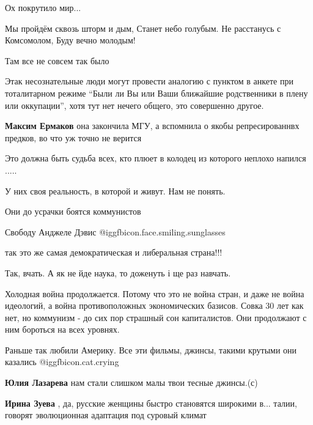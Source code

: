 \begin{itemize}
Ох покрутило мир...


\obeycr
Мы пройдём сквозь шторм и дым,
Станет небо голубым.
Не расстанусь с Комсомолом,
Буду вечно молодым!
\restorecr

Там все не совсем так было


Этак несознательные люди могут провести аналогию с пунктом в анкете при
тоталитарном режиме \enquote{Были ли Вы или Ваши ближайшие родственники в плену или
оккупации}, хотя тут нет нечего общего, это совершенно другое.

\begin{itemize} %
\textbf{Максим Ермаков} она закончила МГУ, а вспомнила о якобы репресированнвх предков, во что уж точно не верится

Это должна быть судьба всех, кто плюет в колодец из которого неплохо напился .....
\end{itemize} %

У них своя реальность, в которой и живут. Нам не понять.

Они до усрачки боятся коммунистов

Свободу Анджеле Дэвис @igg{fbicon.face.smiling.sunglasses} 

так это же самая демократическая и либеральная страна!!!

Так, вчать. А як не йде наука, то доженуть і ще раз навчать.


Холодная война продолжается. Потому что это не война стран, и даже не война
идеологий, а война противоположных экономических базисов. Совка 30 лет как нет,
но коммунизм - до сих пор страшный сон капиталистов. Они продолжают с ним
бороться на всех уровнях.


Раньше так любили Америку. Все эти фильмы, джинсы, такими крутыми они казались @igg{fbicon.cat.crying} 

\begin{itemize} %
\textbf{Юлия Лазарева} нам стали слишком малы твои тесные джинсы.(с)

\textbf{Ирина Зуева} , да, русские женщины быстро становятся широкими в... талии, говорят эволюционная адаптация под суровый климат


\end{itemize}
\end{itemize}
